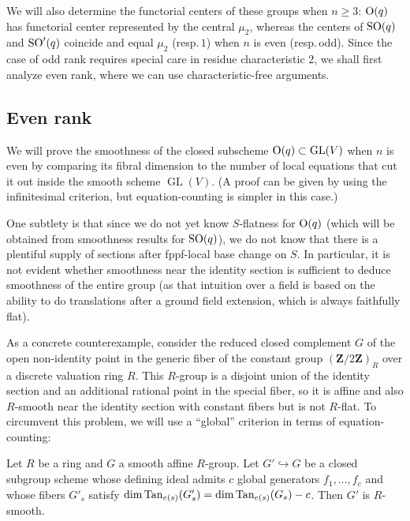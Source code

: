 \documentclass[10pt]{article}
\newcommand{\GL}{\operatorname{GL}}
\renewcommand{\(}{\left(}
\renewcommand{\)}{\right)}
\numberwithin{thm}{subsection}
\begin{document}
We will also determine the functorial centers of these groups when $n \ge 3$:
${\rm{O}}(q)$ has functorial center represented by the central $\mu_2$,
whereas the centers of ${\rm{SO}}(q)$ and ${\rm{SO}}'(q)$ coincide
and equal $\mu_2$ (resp.\,$1$) when $n$ is even (resp.\,odd).
Since the case of odd rank requires special care in residue characteristic 2,
we shall first analyze even rank, where we can use characteristic-free arguments.

\subsection{Even rank}\label{evenrk}

We will prove the smoothness of the closed subscheme ${\rm{O}}(q) \subset \GL(V)$
when $n$ is even by comparing its fibral dimension to  the number of local equations that
cut it out inside the smooth scheme $\GL(V)$.  (A proof can be given by using
the infinitesimal criterion, but equation-counting is simpler in this case.) 

One subtlety is that
since we do not yet know $S$-flatness for ${\rm{O}}(q)$ (which will be obtained from smoothness
results for ${\rm{SO}}(q)$),
we do not know that there is a plentiful supply of sections after fppf-local base change on
$S$.  In particular, it is not evident whether smoothness near the identity section
is sufficient to deduce smoothness of the entire group (as that intuition over a field
is based on the ability to do translations after a ground field extension, which is always faithfully flat).

As a concrete counterexample, consider the reduced
closed complement $G$ of the open non-identity point
in the generic fiber of the constant group $({\mathbf{Z}}/2{\mathbf{Z}})_R$ over
a discrete valuation ring $R$.  This $R$-group 
is a disjoint union of the identity section and an additional
rational point in the special fiber, so it is affine and also $R$-smooth near the identity section with
constant fibers but is not $R$-flat. 
To circumvent this problem, we will use a ``global'' criterion in terms of equation-counting:

\begin{lem}\label{smcrit} Let $R$ be a ring and $G$ a smooth affine $R$-group.
Let $G' \hookrightarrow G$ be a closed subgroup scheme whose
defining ideal admits $c$ global generators $f_1,\dots,f_c$ and whose
fibers $G'_s$ satisfy $\dim {\rm{Tan}}_{e(s)}(G'_s) = \dim {\rm{Tan}}_{e(s)}(G_s) - c$.
Then $G'$ is $R$-smooth.
\end{lem}
\end{document}
